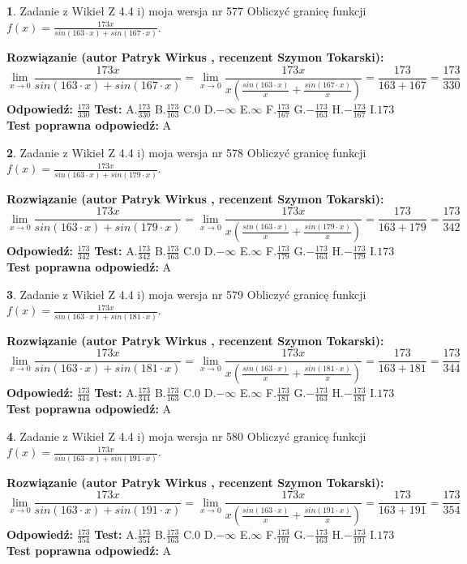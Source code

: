 \documentclass[12pt, a4paper]{article}
\theoremstyle{definition} %
\newtheorem{zad}{}
\newcommand{\zadStart}[1]{\begin{zad}#1\newline}
\newcommand{\zadStop}{\end{zad}}
\newcommand{\rozwStart}[2]{\noindent \textbf{Rozwiązanie (autor #1 , recenzent #2): }\newline}
\newcommand{\rozwStop}{\newline}
\newcommand{\odpStart}{\noindent \textbf{Odpowiedź:}\newline}
\newcommand{\odpStop}{\newline}
\newcommand{\testStart}{\noindent \textbf{Test:}\newline}
\newcommand{\testStop}{\newline}
\newcommand{\kluczStart}{\noindent \textbf{Test poprawna odpowiedź:}\newline}
\newcommand{\kluczStop}{\newline}
\begin{document}
\zadStart{Zadanie z Wikieł Z 4.4 i) moja wersja nr 577}
Obliczyć granicę funkcji $f(x)=\frac{173x}{sin(163\cdot x) +sin(167\cdot x)}$.
\zadStop
\rozwStart{Patryk Wirkus}{Szymon Tokarski}
$$\lim\limits_{x\to 0}\frac{173x}{sin(163\cdot x) +sin(167\cdot x)}=\lim\limits_{x\to 0}\frac{173x}{x(\frac{sin(163\cdot x)}{x}+\frac{sin(167\cdot x)}{x})}=\frac{173}{163+167} = \frac{173}{330}$$
\rozwStop
\odpStart
$\frac{173}{330}$
\odpStop
\testStart
A.$\frac{173}{330}$
B.$\frac{173}{163}$
C.$0$
D.$-\infty$
E.$\infty$
F.$\frac{173}{167}$
G.$-\frac{173}{163}$
H.$-\frac{173}{167}$
I.$173$
\testStop
\kluczStart
A
\kluczStop



\zadStart{Zadanie z Wikieł Z 4.4 i) moja wersja nr 578}
Obliczyć granicę funkcji $f(x)=\frac{173x}{sin(163\cdot x) +sin(179\cdot x)}$.
\zadStop
\rozwStart{Patryk Wirkus}{Szymon Tokarski}
$$\lim\limits_{x\to 0}\frac{173x}{sin(163\cdot x) +sin(179\cdot x)}=\lim\limits_{x\to 0}\frac{173x}{x(\frac{sin(163\cdot x)}{x}+\frac{sin(179\cdot x)}{x})}=\frac{173}{163+179} = \frac{173}{342}$$
\rozwStop
\odpStart
$\frac{173}{342}$
\odpStop
\testStart
A.$\frac{173}{342}$
B.$\frac{173}{163}$
C.$0$
D.$-\infty$
E.$\infty$
F.$\frac{173}{179}$
G.$-\frac{173}{163}$
H.$-\frac{173}{179}$
I.$173$
\testStop
\kluczStart
A
\kluczStop



\zadStart{Zadanie z Wikieł Z 4.4 i) moja wersja nr 579}
Obliczyć granicę funkcji $f(x)=\frac{173x}{sin(163\cdot x) +sin(181\cdot x)}$.
\zadStop
\rozwStart{Patryk Wirkus}{Szymon Tokarski}
$$\lim\limits_{x\to 0}\frac{173x}{sin(163\cdot x) +sin(181\cdot x)}=\lim\limits_{x\to 0}\frac{173x}{x(\frac{sin(163\cdot x)}{x}+\frac{sin(181\cdot x)}{x})}=\frac{173}{163+181} = \frac{173}{344}$$
\rozwStop
\odpStart
$\frac{173}{344}$
\odpStop
\testStart
A.$\frac{173}{344}$
B.$\frac{173}{163}$
C.$0$
D.$-\infty$
E.$\infty$
F.$\frac{173}{181}$
G.$-\frac{173}{163}$
H.$-\frac{173}{181}$
I.$173$
\testStop
\kluczStart
A
\kluczStop



\zadStart{Zadanie z Wikieł Z 4.4 i) moja wersja nr 580}
Obliczyć granicę funkcji $f(x)=\frac{173x}{sin(163\cdot x) +sin(191\cdot x)}$.
\zadStop
\rozwStart{Patryk Wirkus}{Szymon Tokarski}
$$\lim\limits_{x\to 0}\frac{173x}{sin(163\cdot x) +sin(191\cdot x)}=\lim\limits_{x\to 0}\frac{173x}{x(\frac{sin(163\cdot x)}{x}+\frac{sin(191\cdot x)}{x})}=\frac{173}{163+191} = \frac{173}{354}$$
\rozwStop
\odpStart
$\frac{173}{354}$
\odpStop
\testStart
A.$\frac{173}{354}$
B.$\frac{173}{163}$
C.$0$
D.$-\infty$
E.$\infty$
F.$\frac{173}{191}$
G.$-\frac{173}{163}$
H.$-\frac{173}{191}$
I.$173$
\testStop
\kluczStart
A
\kluczStop
\end{document}

